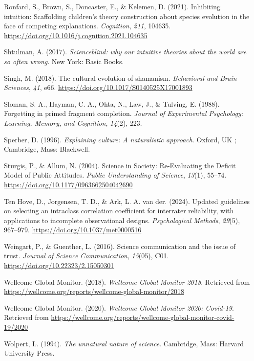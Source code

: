 \documentclass[
  english,
  doc,floatsintext]{apa6}
\newlength{\cslhangindent}
\newenvironment{CSLReferences}[2] %
 {\begin{list}{}{%
  \setlength{\itemindent}{0pt}
  \setlength{\leftmargin}{0pt}
  \setlength{\parsep}{0pt}
  \ifodd #1
   \setlength{\leftmargin}{\cslhangindent}
   \setlength{\itemindent}{-1\cslhangindent}
  \fi
  \setlength{\itemsep}{#2\baselineskip}}}
 {\end{list}}
\begin{document}
\begin{CSLReferences}{1}{0}
Ronfard, S., Brown, S., Doncaster, E., \& Kelemen, D. (2021). Inhibiting intuition: Scaffolding children's theory construction about species evolution in the face of competing explanations. \emph{Cognition}, \emph{211}, 104635. \url{https://doi.org/10.1016/j.cognition.2021.104635}

Shtulman, A. (2017). \emph{Scienceblind: why our intuitive theories about the world are so often wrong}. New York: Basic Books.

Singh, M. (2018). The cultural evolution of shamanism. \emph{Behavioral and Brain Sciences}, \emph{41}, e66. \url{https://doi.org/10.1017/S0140525X17001893}

Sloman, S. A., Hayman, C. A., Ohta, N., Law, J., \& Tulving, E. (1988). Forgetting in primed fragment completion. \emph{Journal of Experimental Psychology: Learning, Memory, and Cognition}, \emph{14}(2), 223.

Sperber, D. (1996). \emph{Explaining culture: A naturalistic approach}. Oxford, UK ; Cambridge, Mass: Blackwell.

Sturgis, P., \& Allum, N. (2004). Science in Society: Re-Evaluating the Deficit Model of Public Attitudes. \emph{Public Understanding of Science}, \emph{13}(1), 55--74. \url{https://doi.org/10.1177/0963662504042690}

Ten Hove, D., Jorgensen, T. D., \& Ark, L. A. van der. (2024). Updated guidelines on selecting an intraclass correlation coefficient for interrater reliability, with applications to incomplete observational designs. \emph{Psychological Methods}, \emph{29}(5), 967--979. \url{https://doi.org/10.1037/met0000516}

Weingart, P., \& Guenther, L. (2016). Science communication and the issue of trust. \emph{Journal of Science Communication}, \emph{15}(05), C01. \url{https://doi.org/10.22323/2.15050301}

Wellcome Global Monitor. (2018). \emph{Wellcome Global Monitor 2018}. Retrieved from \url{https://wellcome.org/reports/wellcome-global-monitor/2018}

Wellcome Global Monitor. (2020). \emph{Wellcome Global Monitor 2020: Covid-19}. Retrieved from \url{https://wellcome.org/reports/wellcome-global-monitor-covid-19/2020}

Wolpert, L. (1994). \emph{The unnatural nature of science}. Cambridge, Mass: Harvard University Press.

\end{CSLReferences}
\end{document}

